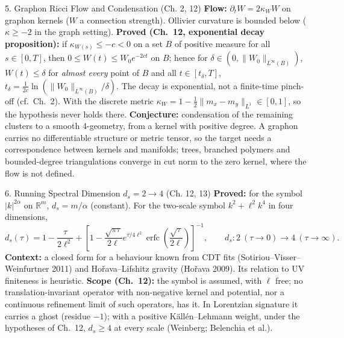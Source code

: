 \documentclass[11pt,a4paper,oneside]{article}
\begin{document}
\begin{conceptbox}{{5. Graphon Ricci Flow and Condensation (Ch. 2, 12)}}
\textbf{Flow:} $\partial_t W = 2\kappa_W W$ on graphon kernels ($W$ a connection strength). Ollivier curvature is bounded below ($\kappa \ge -2$ in the graph setting).
\textbf{Proved (Ch.~12, exponential decay proposition):} if $\kappa_{W(s)} \le -c < 0$ on a set $B$ of positive measure for all $s \in [0,T]$, then $0 \le W(t) \le W_0 e^{-2ct}$ on $B$; hence for $\delta \in (0, \|W_0\|_{L^\infty(B)})$, $W(t) \le \delta$ for \emph{almost every} point of $B$ and all $t \in [t_\delta, T]$, $t_\delta = \frac{1}{2c}\ln(\|W_0\|_{L^\infty(B)}/\delta)$. The decay is exponential, not a finite-time pinch-off (cf.\ Ch.~2). With the discrete metric $\kappa_W = 1 - \tfrac12\|m_x - m_y\|_{L^1} \in [0,1]$, so the hypothesis never holds there.
\textbf{Conjecture:} condensation of the remaining clusters to a smooth 4-geometry, from a kernel with positive degree. A graphon carries no differentiable structure or metric tensor, so the target needs a correspondence between kernels and manifolds; trees, branched polymers and bounded-degree triangulations converge in cut norm to the zero kernel, where the flow is not defined.
\end{conceptbox}

\begin{conceptbox}{{6. Running Spectral Dimension $d_s = 2 \to 4$ (Ch. 12, 13)}}
\textbf{Proved:} for the symbol $|k|^{2\alpha}$ on $\mathbb{R}^m$, $d_s = m/\alpha$ (constant). For the two-scale symbol $k^2 + \ell^2 k^4$ in four dimensions,
$$d_s(\tau) = 1 - \frac{\tau}{2\ell^2} + \left[ 1 - \frac{\sqrt{\pi \tau}}{2\ell} e^{\tau/4\ell^2} \operatorname{erfc}\!\left( \frac{\sqrt{\tau}}{2\ell} \right) \right]^{-1}, \qquad d_s: 2 \ (\tau \to 0) \to 4 \ (\tau \to \infty).$$
\textbf{Context:} a closed form for a behaviour known from CDT fits (Sotiriou--Visser--Weinfurtner 2011) and Ho\v{r}ava--Lifshitz gravity (Ho\v{r}ava 2009). Its relation to UV finiteness is heuristic. \textbf{Scope (Ch.~12):} the symbol is assumed, with $\ell$ free; no translation-invariant operator with non-negative kernel and potential, nor a continuous refinement limit of such operators, has it. In Lorentzian signature it carries a ghost (residue $-1$); with a positive K\"all\'en--Lehmann weight, under the hypotheses of Ch.~12, $d_s \ge 4$ at every scale (Weinberg; Belenchia et al.).
\end{conceptbox}
\end{document}
